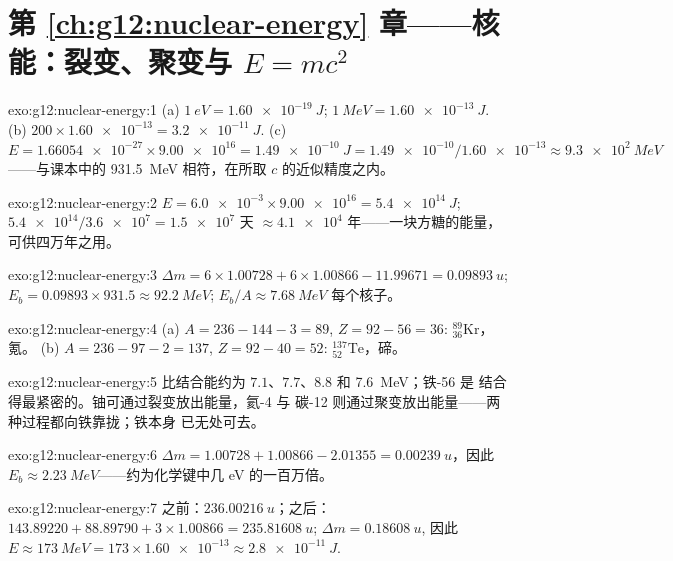 \section*{第 \ref{ch:g12:nuclear-energy} 章——核能：裂变、聚变与 $E=mc^2$}

\begin{solution}{exo:g12:nuclear-energy:1}
(a) $\qty{1}{eV} = \qty{1.60e-19}{J}$;
$\qty{1}{MeV} = \qty{1.60e-13}{J}$.
(b) $200 \times \num{1.60e-13} = \qty{3.2e-11}{J}$.
(c) $E = \num{1.66054e-27} \times \num{9.00e16} = \qty{1.49e-10}{J}
= \num{1.49e-10}/\num{1.60e-13} \approx \qty{9.3e2}{MeV}$——与课本中的
\qty{931.5}{MeV} 相符，在所取 $c$ 的近似精度之内。
\end{solution}

\begin{solution}{exo:g12:nuclear-energy:2}
$E = \num{6.0e-3} \times \num{9.00e16} = \qty{5.4e14}{J}$;
$\num{5.4e14}/\num{3.6e7} = \num{1.5e7}$ 天 $\approx \num{4.1e4}$
年——一块方糖的能量，可供四万年之用。
\end{solution}

\begin{solution}{exo:g12:nuclear-energy:3}
$\Delta m = 6 \times 1.00728 + 6 \times 1.00866 - 11.99671 =
\qty{0.09893}{u}$; $E_b = 0.09893 \times 931.5 \approx \qty{92.2}{MeV}$;
$E_b/A \approx \qty{7.68}{MeV}$ 每个核子。
\end{solution}

\begin{solution}{exo:g12:nuclear-energy:4}
(a) $A = 236 - 144 - 3 = 89$, $Z = 92 - 56 = 36$:
${}^{89}_{36}\mathrm{Kr}$，氪。
(b) $A = 236 - 97 - 2 = 137$, $Z = 92 - 40 = 52$:
${}^{137}_{52}\mathrm{Te}$，碲。
\end{solution}

\begin{solution}{exo:g12:nuclear-energy:5}
比结合能约为 $7.1$、$7.7$、$8.8$ 和 \qty{7.6}{MeV}；铁-56 是
结合得最紧密的。铀可通过裂变放出能量，氦-4 与
碳-12 则通过聚变放出能量——两种过程都向铁靠拢；铁本身
已无处可去。
\end{solution}

\begin{solution}{exo:g12:nuclear-energy:6}
$\Delta m = 1.00728 + 1.00866 - 2.01355 = \qty{0.00239}{u}$，因此
$E_b \approx \qty{2.23}{MeV}$——约为化学键中几
\unit{eV} 的一百万倍。
\end{solution}

\begin{solution}{exo:g12:nuclear-energy:7}
之前：$\qty{236.00216}{u}$；之后：$143.89220 + 88.89790 +
3 \times 1.00866 = \qty{235.81608}{u}$; $\Delta m = \qty{0.18608}{u}$,
因此 $E \approx \qty{173}{MeV} = 173 \times \num{1.60e-13} \approx
\qty{2.8e-11}{J}$.
\end{solution}

